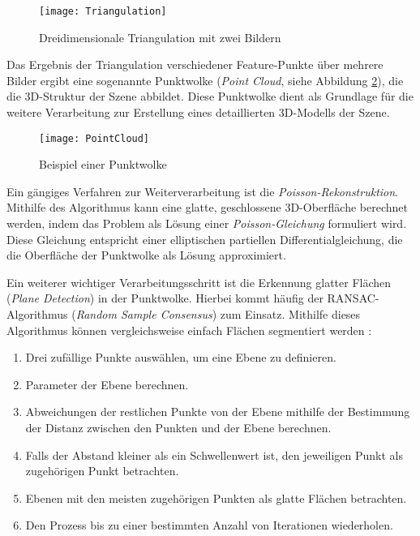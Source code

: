 \begin{figure}
    \centering
    \texttt{[image: Triangulation]}
    \caption{Dreidimensionale Triangulation mit zwei Bildern\label{fig:Triangulation}}\par
\end{figure}

Das Ergebnis der Triangulation verschiedener Feature-Punkte über mehrere Bilder ergibt eine sogenannte Punktwolke (\emph{Point Cloud}, siehe Abbildung \ref{fig:PointCloud}), die die 3D-Struktur der Szene abbildet. Diese Punktwolke dient als Grundlage für die weitere Verarbeitung zur Erstellung eines detaillierten 3D-Modells der Szene.

\begin{figure}
    \centering
    \texttt{[image: PointCloud]}
    \caption{Beispiel einer Punktwolke \cite{open3d2025pointcloud}\label{fig:PointCloud}}\par
\end{figure}

Ein gängiges Verfahren zur Weiterverarbeitung ist die \emph{Poisson-Rekonstruktion}. Mithilfe des Algorithmus kann eine glatte, geschlossene 3D-Oberfläche berechnet werden, indem das Problem als Lösung einer \emph{Poisson-Gleichung} formuliert wird. Diese Gleichung entspricht einer elliptischen partiellen Differentialgleichung, die die Oberfläche der Punktwolke als Lösung approximiert. \cite{kazhdan2006poisson}

Ein weiterer wichtiger Verarbeitungsschritt ist die Erkennung glatter Flächen (\emph{Plane Detection}) in der Punktwolke. Hierbei kommt häufig der RANSAC-Algorithmus (\emph{Random Sample Consensus}) zum Einsatz. Mithilfe dieses Algorithmus können vergleichsweise einfach Flächen segmentiert werden \cite{yang2010planeDetection, ajith2020ransac}:

\begin{enumerate}
    \item Drei zufällige Punkte auswählen, um eine Ebene zu definieren.
    \item Parameter der Ebene berechnen.
    \item Abweichungen der restlichen Punkte von der Ebene mithilfe der Bestimmung der Distanz zwischen den Punkten und der Ebene berechnen.
    \item Falls der Abstand kleiner als ein Schwellenwert ist, den jeweiligen Punkt als zugehörigen Punkt betrachten.
    \item Ebenen mit den meisten zugehörigen Punkten als glatte Flächen betrachten.
    \item Den Prozess bis zu einer bestimmten Anzahl von Iterationen wiederholen.
\end{enumerate}

